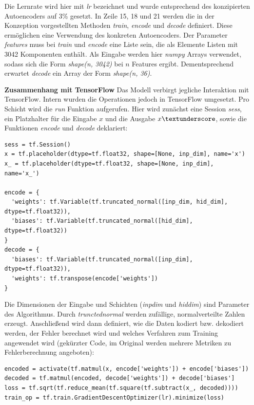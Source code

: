 Die Lernrate wird hier mit \textit{lr} bezeichnet und wurde entsprechend des konzipierten Autoencoders auf 3\% gesetzt.\newline
In Zeile 15, 18 und 21 werden die in der Konzeption vorgestellten Methoden \textit{train}, \textit{encode} und \textit{decode} definiert. Diese ermöglichen eine Verwendung des konkreten Autoencoders. Der Parameter \textit{features} muss bei \textit{train} und \textit{encode} eine Liste sein, die als Elemente Listen mit 3042 Komponenten enthält. Als Eingabe werden hier \textit{numpy} Arrays verwendet, sodass sich die Form \textit{shape(n, 3042)} bei $n$ Features ergibt. Dementsprechend erwartet \textit{decode} ein Array der Form \textit{shape(n, 36)}.\newline

\textbf{Zusammenhang mit TensorFlow} Das Modell verbirgt jegliche Interaktion mit TensorFlow. Intern wurden die Operationen jedoch in TensorFlow umgesetzt. Pro Schicht wird die \textit{run} Funktion aufgerufen. Hier wird zunächst eine Session \textit{sess}, ein Platzhalter für die Eingabe $x$ und die Ausgabe $x\textunderscore$, sowie die Funktionen \textit{encode} und \textit{decode} deklariert:

\begin{lstlisting}[style=Python]
sess = tf.Session()
x = tf.placeholder(dtype=tf.float32, shape=[None, inp_dim], name='x')
x_ = tf.placeholder(dtype=tf.float32, shape=[None, inp_dim], name='x_')

encode = { 
  'weights': tf.Variable(tf.truncated_normal([inp_dim, hid_dim], dtype=tf.float32)),
  'biases': tf.Variable(tf.truncated_normal([hid_dim], dtype=tf.float32))
}
decode = {
  'biases': tf.Variable(tf.truncated_normal([inp_dim], dtype=tf.float32)),
  'weights': tf.transpose(encode['weights'])
}
\end{lstlisting}

Die Dimensionen der Eingabe und Schichten (\textit{inp\textunderscore dim} und \textit{hid\textunderscore dim}) sind Parameter des Algorithmus. Durch \textit{truncted\textunderscore normal} werden zufällige, normalverteilte Zahlen erzeugt. Anschließend wird dann definiert, wie die Daten kodiert bzw. dekodiert werden, der Fehler berechnet wird und welches Verfahren zum Training angewendet wird (gekürzter Code, im Original werden mehrere Metriken zu Fehlerberechnung angeboten):

\begin{lstlisting}[style=Python]
encoded = activate(tf.matmul(x, encode['weights']) + encode['biases'])
decoded = tf.matmul(encoded, decode['weights']) + decode['biases']
loss = tf.sqrt(tf.reduce_mean(tf.square(tf.subtract(x_, decoded))))
train_op = tf.train.GradientDescentOptimizer(lr).minimize(loss)
\end{lstlisting}

